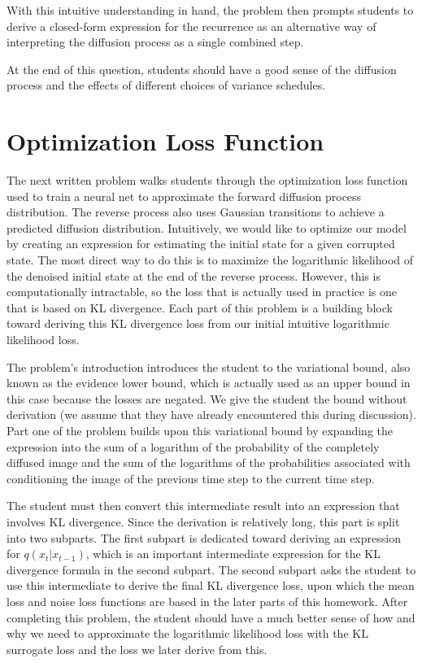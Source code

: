 \documentclass{article}
\begin{document}
With this intuitive understanding in hand, the problem then prompts students to derive a closed-form expression for the recurrence as an alternative way of interpreting the diffusion process as a single combined step.

At the end of this question, students should have a good sense of the diffusion process and the effects of different choices of variance schedules.

\section{Optimization Loss Function}

The next written problem walks students through the optimization loss function used to train a neural net to approximate the forward diffusion process distribution. The reverse process also uses Gaussian transitions to achieve a predicted diffusion distribution. Intuitively, we would like to optimize our model by creating an expression for estimating the initial state for a given corrupted state. The most direct way to do this is to maximize the logarithmic likelihood of the denoised initial state at the end of the reverse process. However, this is computationally intractable, so the loss that is actually used in practice is one that is based on KL divergence. Each part of this problem is a building block toward deriving this KL divergence loss from our initial intuitive logarithmic likelihood loss. 

The problem’s introduction introduces the student to the variational bound, also known as the evidence lower bound, which is actually used as an upper bound in this case because the losses are negated. We give the student the bound without derivation (we assume that they have already encountered this during discussion). Part one of the problem builds upon this variational bound by expanding the expression into the sum of a logarithm of the probability of the completely diffused image and the sum of the logarithms of the probabilities associated with conditioning the image of the previous time step to the current time step. 

The student must then convert this intermediate result into an expression that involves KL divergence. Since the derivation is relatively long, this part is split into two subparts. The first subpart is dedicated toward deriving an expression for $q(x_t|x_{t-1})$, which is an important intermediate expression for the KL divergence formula in the second subpart. The second subpart asks the student to use this intermediate to derive the final KL divergence loss, upon which the mean loss and noise loss functions are based in the later parts of this homework. After completing this problem, the student should have a much better sense of how and why we need to approximate the logarithmic likelihood loss with the KL surrogate loss and the loss we later derive from this.
\end{document}
